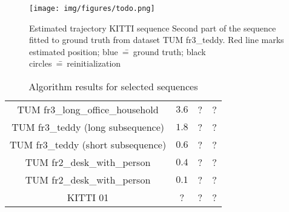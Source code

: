 \begin{figure}[ht]
	\centering\texttt{[image: img/figures/todo.png]}
	\caption{ Estimated trajectory KITTI sequence Second part of the sequence fitted to ground truth from dataset TUM fr3\_teddy. Red line marks estimated position; blue~\==~ground truth; black circles~\==~reinitialization }
	\label{fig:kitti_3}
\end{figure}








\begin{table}[ht]
	\centering
	
	\begin{threeparttable}
		\caption{Algorithm results for selected sequences}
		\label{tab:drift}
		
		\begin{tabularx}{1.0\textwidth}{C{0.4} C{0.2} C{0.1} C{0.2}}
			\toprule
			 &  &  &  \\
			\midrule
			TUM fr3\_long\_office\_household & $3.6$ & ? & ? \\
			TUM fr3\_teddy (long subsequence) & $1.8$ & ? & ? \\
			TUM fr3\_teddy (short subsequence) & $0.6$ & ? & ? \\
			TUM fr2\_desk\_with\_person & $0.4$ & ? & ? \\
			TUM fr2\_desk\_with\_person & $0.1$ & ? & ? \\
			KITTI 01 & ? & ? & ? \\
			\bottomrule
		\end{tabularx}
		
	\end{threeparttable}
\end{table}






